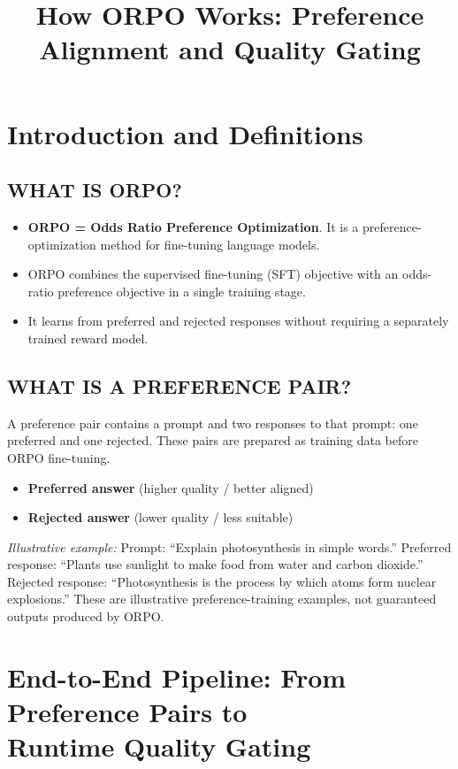 \documentclass{article}
\title{How ORPO Works: Preference Alignment and Quality Gating}
\date{}
\newcommand{\cmark}{\ding{51}}%
\newcommand{\xmark}{\ding{55}}%
\begin{document}
\maketitle

\section{Introduction and Definitions}

\subsection{WHAT IS ORPO?}
\begin{itemize}
    \item \textbf{ORPO = Odds Ratio Preference Optimization}. It is a preference-optimization method for fine-tuning language models.
    \item ORPO combines the supervised fine-tuning (SFT) objective with an odds-ratio preference objective in a single training stage.
    \item It learns from preferred and rejected responses without requiring a separately trained reward model.
\end{itemize}

\subsection{WHAT IS A PREFERENCE PAIR?}
A preference pair contains a prompt and two responses to that prompt: one preferred and one rejected. These pairs are prepared as training data before ORPO fine-tuning.
\begin{itemize}
    \item[\cmark] \textbf{Preferred answer} (higher quality / better aligned)
    \item[\xmark] \textbf{Rejected answer} (lower quality / less suitable)
\end{itemize}

\noindent\textit{Illustrative example:} Prompt: ``Explain photosynthesis in simple words.'' Preferred response: ``Plants use sunlight to make food from water and carbon dioxide.'' Rejected response: ``Photosynthesis is the process by which atoms form nuclear explosions.'' These are illustrative preference-training examples, not guaranteed outputs produced by ORPO.

\raggedbottom
\newpage

\section{End-to-End Pipeline: From Preference Pairs to\\ Runtime Quality Gating}
\end{document}
